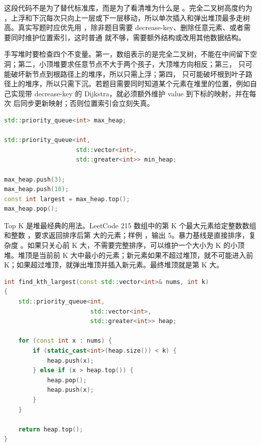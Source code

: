 这段代码不是为了替代标准库，而是为了看清堆为什么是 。完全二叉树高度约为 ，上浮和下沉每次只向上一层或下一层移动，所以单次插入和弹出堆顶最多走树高。真实写题时应优先用 ，除非题目需要 decrease-key、删除任意元素、或者需要同时维护位置索引，这时普通  就不够，需要额外结构或改用其他数据结构。

手写堆时要检查四个不变量。第一，数组表示的是完全二叉树，不能在中间留下空洞；第二，小顶堆要求任意节点不大于两个孩子，大顶堆方向相反；第三， 只可能破坏新节点到根路径上的堆序，所以只需上浮；第四， 只可能破坏根到叶子路径上的堆序，所以只需下沉。若题目需要同时知道某个元素在堆里的位置，例如自己实现带 decrease-key 的 Dijkstra，就必须额外维护 value 到下标的映射，并在每次  后同步更新映射；否则位置索引会立刻失真。

\begin{lstlisting}[language=C++,caption={priority\_queue 的大顶堆和小顶堆}]
std::priority_queue<int> max_heap;

std::priority_queue<int,
                    std::vector<int>,
                    std::greater<int>> min_heap;

max_heap.push(3);
max_heap.push(10);
const int largest = max_heap.top();
max_heap.pop();
\end{lstlisting}

Top K 是堆最经典的用法。LeetCode 215 数组中的第 K 个最大元素给定整数数组和整数 ，要求返回排序后第  大的元素；样例 ，输出 5。暴力基线是直接排序，复杂度 。如果只关心前 K 大，不需要完整排序，可以维护一个大小为 K 的小顶堆。堆顶是当前前 K 大中最小的元素；新元素如果不超过堆顶，就不可能进入前 K；如果超过堆顶，就弹出堆顶并插入新元素。最终堆顶就是第 K 大。

\begin{lstlisting}[language=C++,caption={LeetCode 215 数组中的第 K 个最大元素：大小为 K 的小顶堆}]
int find_kth_largest(const std::vector<int>& nums, int k)
{
    std::priority_queue<int,
                        std::vector<int>,
                        std::greater<int>> heap;

    for (const int x : nums) {
        if (static_cast<int>(heap.size()) < k) {
            heap.push(x);
        } else if (x > heap.top()) {
            heap.pop();
            heap.push(x);
        }
    }

    return heap.top();
}
\end{lstlisting}

